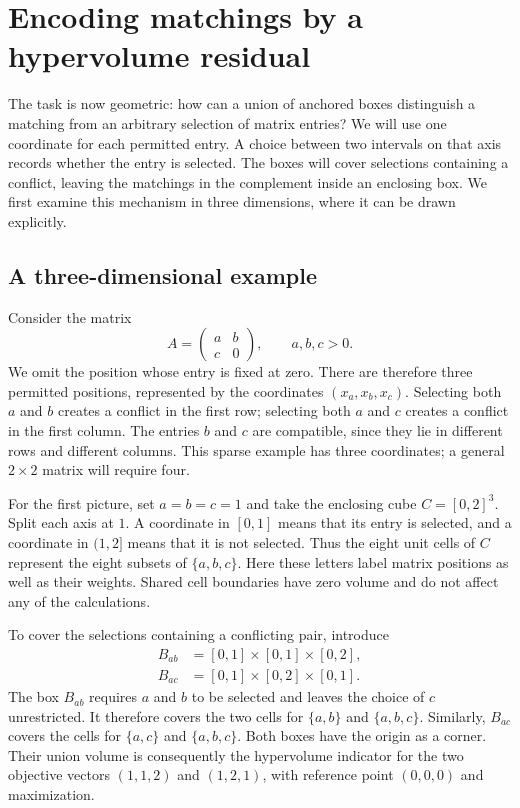 \documentclass[12pt,a4paper]{article}
\theoremstyle{definition}
\theoremstyle{remark}
\begin{document}
\section{Encoding matchings by a hypervolume residual}
\label{sec:construction}

The task is now geometric: how can a union of anchored boxes distinguish
a matching from an arbitrary selection of matrix entries? We will use
one coordinate for each permitted entry. A choice between two intervals
on that axis records whether the entry is selected. The boxes will
cover selections containing a conflict, leaving the matchings in the
complement inside an enclosing box. We first examine this mechanism
in three dimensions, where it can be drawn explicitly.

\subsection{A three-dimensional example}
\label{sec:3d-example}

Consider the matrix
\[
 A=\begin{pmatrix}a&b\\c&0\end{pmatrix},\qquad a,b,c>0.
\]
We omit the position whose entry is fixed at zero. There are therefore
three permitted positions, represented by the coordinates
$(x_a,x_b,x_c)$. Selecting both $a$ and $b$ creates a conflict in the
first row; selecting both $a$ and $c$ creates a conflict in the first
column. The entries $b$ and $c$ are compatible, since they lie in
different rows and different columns. This sparse example has three
coordinates; a general $2\times2$ matrix will require four.

For the first picture, set $a=b=c=1$ and take the enclosing cube
$C=[0,2]^3$. Split each axis at $1$. A coordinate in $[0,1]$ means
that its entry is selected, and a coordinate in $(1,2]$ means that
it is not selected. Thus the eight unit cells of $C$ represent the
eight subsets of $\{a,b,c\}$. Here these letters label matrix positions
as well as their weights. Shared cell boundaries have zero volume and
do not affect any of the calculations.

To cover the selections containing a conflicting pair, introduce
\begin{equation}
 \begin{aligned}
 B_{ab}&=[0,1]\times[0,1]\times[0,2],\\
 B_{ac}&=[0,1]\times[0,2]\times[0,1].
 \end{aligned}
 \label{eq:3d-boxes}
\end{equation}
The box $B_{ab}$ requires $a$ and $b$ to be selected and leaves the
choice of $c$ unrestricted. It therefore covers the two cells for
$\{a,b\}$ and $\{a,b,c\}$. Similarly, $B_{ac}$ covers the cells for
$\{a,c\}$ and $\{a,b,c\}$. Both boxes have the origin as a corner.
Their union volume is consequently the hypervolume indicator for the
two objective vectors $(1,1,2)$ and $(1,2,1)$, with reference point
$(0,0,0)$ and maximization.
\end{document}

